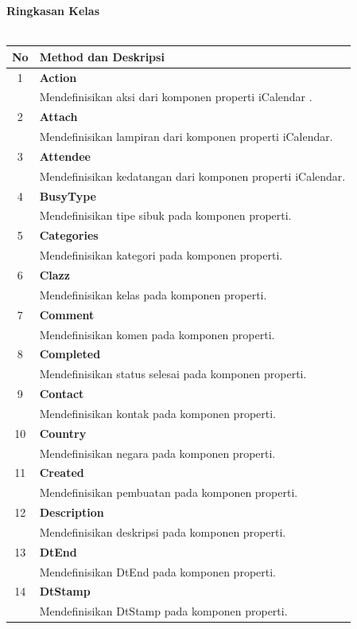 	\noindent \textbf{Ringkasan Kelas}\cite{ical}\\ \\
	\begin{longtable}{|c|p{12cm}|}
		\hline
		\textbf{No} & \textbf{Method dan Deskripsi} \\ \hline \hline
		1 & \textbf{Action}\\
			&	Mendefinisikan aksi dari komponen properti iCalendar .\\ \hline
		2 & \textbf{Attach}\\
			&	Mendefinisikan lampiran dari komponen properti iCalendar. \\ \hline
		3 & \textbf{Attendee}\\
			&	Mendefinisikan kedatangan dari komponen properti iCalendar.\\ \hline
		4 & \textbf{BusyType}\\
			&	Mendefinisikan tipe sibuk pada komponen properti.\\ \hline
		5 & \textbf{Categories}\\
			&	Mendefinisikan kategori pada komponen properti.\\ \hline
		6 & \textbf{Clazz}\\
			&	Mendefinisikan kelas pada komponen properti.\\ \hline
		7 & \textbf{Comment}\\
			&	Mendefinisikan komen pada komponen properti.\\ \hline
		8 & \textbf{Completed}\\
			&	Mendefinisikan status selesai pada komponen properti.\\ \hline
		9 & \textbf{Contact}\\
			&	Mendefinisikan kontak pada komponen properti.\\ \hline
		10 & \textbf{Country}\\
			&	Mendefinisikan negara pada komponen properti.\\ \hline
		11 & \textbf{Created}\\
			&	Mendefinisikan pembuatan pada komponen properti.\\ \hline
		12 & \textbf{Description}\\
			&	Mendefinisikan deskripsi pada komponen properti.\\ \hline
		13 & \textbf{DtEnd}\\
			&	Mendefinisikan DtEnd pada komponen properti.\\ \hline
		14 & \textbf{DtStamp}\\
			&	Mendefinisikan DtStamp pada komponen properti.\\ \hline

\end{longtable}
